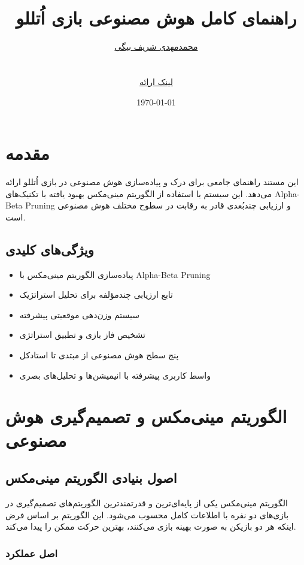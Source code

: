 \documentclass[12pt]{article}
\title{\Huge\bfseries راهنمای کامل هوش مصنوعی بازی اُتللو\\
	\vspace{0.5cm}
	\Large\lr{Complete Guide to Othello AI with Minimax Algorithm}}
\author{\href{https://github.com/MohammadMahdi-Sharifbeigy}{محمدمهدی شریف بیگی} \\ 
	\lr{MohammadMahdi Sharifbeigy}\\
	\small \lr{Advanced AI Implementation with Enhanced Minimax}\\
	\href{link-to-video}{لینک ارائه}}
\date{\today}
\begin{document}
	
	\maketitle
	
	\tableofcontents
	\newpage
	
	\section{مقدمه}
	
	این مستند راهنمای جامعی برای درک و پیاده‌سازی هوش مصنوعی در بازی اُتللو ارائه می‌دهد. این سیستم با استفاده از الگوریتم مینی‌مکس بهبود یافته با تکنیک‌های Alpha-Beta Pruning و ارزیابی چندبُعدی قادر به رقابت در سطوح مختلف هوش مصنوعی است.
	
	\subsection{ویژگی‌های کلیدی}
	
	\begin{itemize}
		\item پیاده‌سازی الگوریتم مینی‌مکس با Alpha-Beta Pruning
		\item تابع ارزیابی چندمؤلفه برای تحلیل استراتژیک
		\item سیستم وزن‌دهی موقعیتی پیشرفته
		\item تشخیص فاز بازی و تطبیق استراتژی
		\item پنج سطح هوش مصنوعی از مبتدی تا استادکل
		\item واسط کاربری پیشرفته با انیمیشن‌ها و تحلیل‌های بصری
	\end{itemize}
	
	\section{الگوریتم مینی‌مکس و تصمیم‌گیری هوش مصنوعی}
	
	\subsection{اصول بنیادی الگوریتم مینی‌مکس}
	
	الگوریتم مینی‌مکس یکی از پایه‌ای‌ترین و قدرتمندترین الگوریتم‌های تصمیم‌گیری در بازی‌های دو نفره با اطلاعات کامل محسوب می‌شود. این الگوریتم بر اساس فرض اینکه هر دو بازیکن به صورت بهینه بازی می‌کنند، بهترین حرکت ممکن را پیدا می‌کند.
	
	\subsubsection{اصل عملکرد}
	
\end{document}
